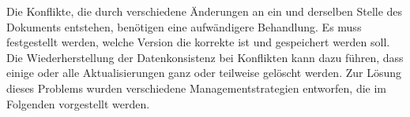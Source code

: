 Die Konflikte, die durch verschiedene Änderungen an ein und derselben Stelle des Dokuments entstehen, benötigen eine aufwändigere Behandlung.
Es muss festgestellt werden, welche Version die korrekte ist und gespeichert werden soll.
Die Wiederherstellung der Datenkonsistenz bei Konflikten kann dazu führen, dass einige oder alle Aktualisierungen ganz oder teilweise gelöscht werden.
Zur Lösung dieses Problems wurden verschiedene Managementstrategien entworfen, die im Folgenden vorgestellt werden.
%
%
